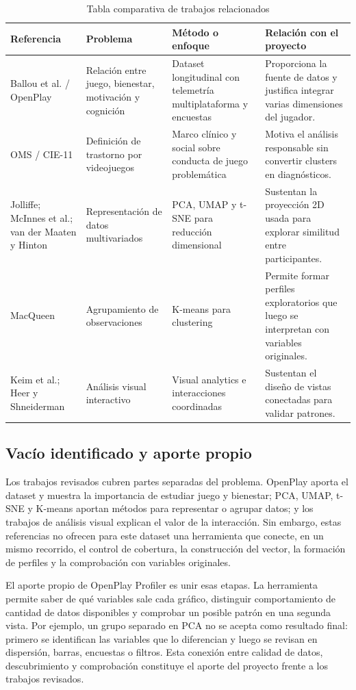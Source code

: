 \documentclass[12pt,a4paper]{article}
\begin{document}
\begin{table}[H]
\centering
\caption{Tabla comparativa de trabajos relacionados}
\begin{tabularx}{\textwidth}{p{3.1cm} p{3.5cm} p{4cm} X}
\toprule
\textbf{Referencia} & \textbf{Problema} & \textbf{M\'etodo o enfoque} & \textbf{Relaci\'on con el proyecto} \\
\midrule
Ballou et al. / OpenPlay & Relaci\'on entre juego, bienestar, motivaci\'on y cognici\'on & Dataset longitudinal con telemetr\'ia multiplataforma y encuestas & Proporciona la fuente de datos y justifica integrar varias dimensiones del jugador. \\
OMS / CIE-11 & Definici\'on de trastorno por videojuegos & Marco cl\'inico y social sobre conducta de juego problem\'atica & Motiva el an\'alisis responsable sin convertir clusters en diagn\'osticos. \\
Jolliffe; McInnes et al.; van der Maaten y Hinton & Representaci\'on de datos multivariados & PCA, UMAP y t-SNE para reducci\'on dimensional & Sustentan la proyecci\'on 2D usada para explorar similitud entre participantes. \\
MacQueen & Agrupamiento de observaciones & K-means para clustering & Permite formar perfiles exploratorios que luego se interpretan con variables originales. \\
Keim et al.; Heer y Shneiderman & An\'alisis visual interactivo & Visual analytics e interacciones coordinadas & Sustentan el dise\~no de vistas conectadas para validar patrones. \\
\bottomrule
\end{tabularx}
\end{table}

\subsection{Vac\'io identificado y aporte propio}

Los trabajos revisados cubren partes separadas del problema. OpenPlay aporta el dataset y muestra la importancia de estudiar juego y bienestar; PCA, UMAP, t-SNE y K-means aportan m\'etodos para representar o agrupar datos; y los trabajos de an\'alisis visual explican el valor de la interacci\'on. Sin embargo, estas referencias no ofrecen para este dataset una herramienta que conecte, en un mismo recorrido, el control de cobertura, la construcci\'on del vector, la formaci\'on de perfiles y la comprobaci\'on con variables originales.

El aporte propio de OpenPlay Profiler es unir esas etapas. La herramienta permite saber de qu\'e variables sale cada gr\'afico, distinguir comportamiento de cantidad de datos disponibles y comprobar un posible patr\'on en una segunda vista. Por ejemplo, un grupo separado en PCA no se acepta como resultado final: primero se identifican las variables que lo diferencian y luego se revisan en dispersi\'on, barras, encuestas o filtros. Esta conexi\'on entre calidad de datos, descubrimiento y comprobaci\'on constituye el aporte del proyecto frente a los trabajos revisados.
\end{document}
